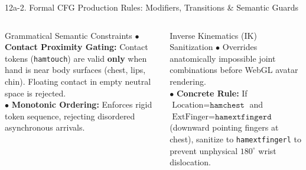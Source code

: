 \documentclass[aspectratio=169]{beamer}
\begin{document}
\begin{frame}[t]{12a-2. Formal CFG Production Rules: Modifiers, Transitions \& Semantic Guards}
\vspace{1.5mm}
\begin{columns}[T]
    \begin{block}{Grammatical Semantic Constraints}
        \fontsize{6.6pt}{8.4pt}\selectfont
        $\bullet$ \textbf{Contact Proximity Gating:} Contact tokens (\texttt{hamtouch}) are valid \textbf{only} when hand is near body surfaces (chest, lips, chin). Floating contact in empty neutral space is rejected.\\
        $\bullet$ \textbf{Monotonic Ordering:} Enforces rigid token sequence, rejecting disordered asynchronous arrivals.
    \end{block}

    \begin{block}{Inverse Kinematics (IK) Sanitization}
        \fontsize{6.6pt}{8.4pt}\selectfont
        $\bullet$ Overrides anatomically impossible joint combinations before WebGL avatar rendering.\\
        $\bullet$ \textbf{Concrete Rule:} If $\text{Location} = \texttt{hamchest}$ and $\text{ExtFinger} = \texttt{hamextfingerd}$ (downward pointing fingers at chest), sanitize to \texttt{hamextfingerl} to prevent unphysical $180^\circ$ wrist dislocation.
    \end{block}
\end{columns}
\end{frame}
\end{document}
